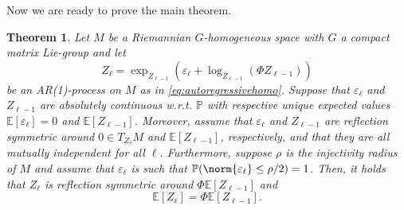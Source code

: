 \documentclass[12pt,a4paper]{article}
\newtheorem{theorem}{Theorem}[section]
\theoremstyle{definition}
\theoremstyle{remark}
\begin{document}
Now we are ready to prove the main theorem.

\begin{theorem}
\label{thm:ARexpect}
Let $M$ be a Riemannian $G$-homogeneous space with $G$ a compact matrix Lie-group and let
\[
Z_\ell = \exp_{Z_{\ell-1}}(\varepsilon_\ell + \log_{Z_{\ell-1}}(\Phi Z_{\ell-1}))
\]
be an AR(1)-process on $M$ as in \eqref{eq:autoregressivehomo}. Suppose that $\varepsilon_\ell$ and $Z_{\ell-1}$ are absolutely continuous w.r.t. $\mathbb{P}$ with respective unique expected values $\mathbb{E}[\varepsilon_\ell]=0$ and $\mathbb{E}[Z_{\ell-1}]$. Moreover, assume that $\varepsilon_\ell$  and $Z_{\ell-1}$ are reflection symmetric around $0\in T_{Z_\ell} M$ and $\mathbb{E}[Z_{\ell-1}]$, respectively, and that they are all mutually independent for all $\ell$. Furthermore, suppose $\rho$ is the injectivity radius of $M$ and assume that $\varepsilon_{\ell}$ is such that $\mathbb{P}(\norm{\varepsilon_\ell} \leq \rho/2)=1$. Then, it holds that $Z_\ell$ is reflection symmetric around $\Phi \mathbb{E}[Z_{\ell-1}]$ and
\[
\mathbb{E}[Z_\ell]= \Phi \mathbb{E} [Z_{\ell-1}].
\]
\end{theorem}
\end{document}
